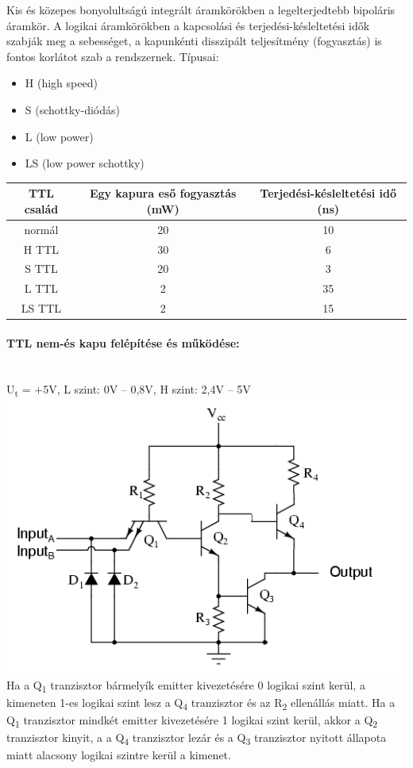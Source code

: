 Kis és közepes bonyolultságú integrált áramkörökben a legelterjedtebb bipoláris áramkör. A logikai áramkörökben a kapcsolási és terjedési-késleltetési idők szabják meg a sebességet, a kapunkénti disszipált teljesítmény (fogyasztás) is fontos korlátot szab a rendszernek.
Típusai:
\begin{itemize}[nosep]
	\item H (high speed)
	\item S (schottky-diódás)
	\item L (low power)
	\item LS (low power schottky)
\end{itemize}
\begin{tabular}{|c|c|c|}
	\hline 
	TTL család & Egy kapura eső fogyasztás (mW) & Terjedési-késleltetési idő (ns) \\ 
	\hline 
	normál & 20 & 10 \\ 
	\hline 
	H TTL & 30 & 6 \\ 
	\hline 
	S TTL & 20 & 3 \\ 
	\hline 
	L TTL & 2 & 35 \\ 
	\hline 
	LS TTL & 2 & 15 \\ 
	\hline 
\end{tabular} 
\paragraph{TTL nem-és kapu felépítése és működése:}~\\
U\textsubscript{t} = +5V, L szint: 0V -- 0,8V, H szint: 2,4V -- 5V\\
\includegraphics[width=0.5\linewidth]{fig/11-TTL_NAND_schema}
Ha a Q\textsubscript{1} tranzisztor bármelyík emitter kivezetésére 0 logikai szint kerül, a kimeneten 1-es logikai szint lesz a Q\textsubscript{4} tranzisztor és az R\textsubscript{2} ellenállás miatt. Ha a Q\textsubscript{1} tranzisztor mindkét emitter kivezetésére 1 logikai szint kerül, akkor a Q\textsubscript{2} tranzisztor kinyit, a a Q\textsubscript{4} tranzisztor lezár és a Q\textsubscript{3} tranzisztor nyitott állapota miatt alacsony logikai szintre kerül a kimenet.

